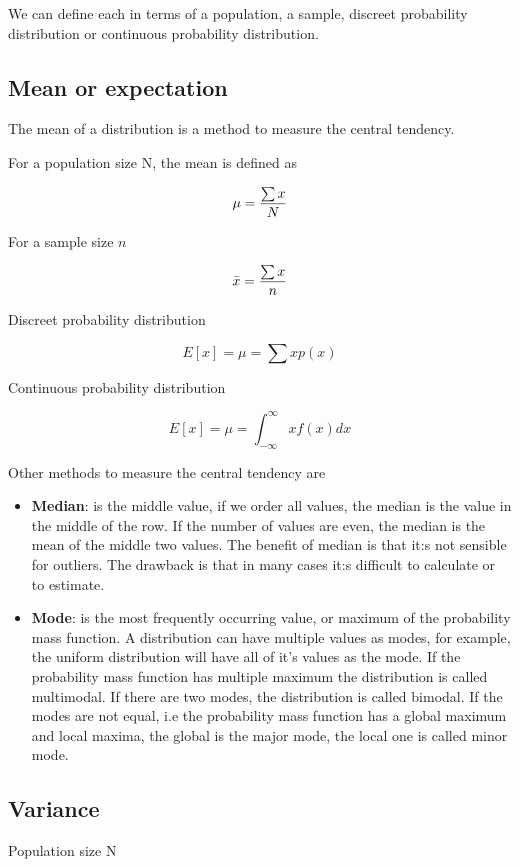 We can define each in terms of a population, a sample, discreet probability distribution or continuous probability distribution.

\subsection{Mean or expectation}

The mean of a distribution is a method to measure the central tendency.

For a population size N, the mean is defined as

\[\mu = {\sum x \over N}\]

For a sample size \(n\)

\[\bar x = {\sum x \over n}\]

Discreet probability distribution

\[E[x] = \mu = \sum x p(x)\]

Continuous probability distribution

\[E[x] = \mu = \int_{-\infty}^\infty x f(x) dx\]

Other methods to measure the central tendency are

\begin{itemize}
    \item \textbf{Median}: is the middle value, if we order all values, the median is the value in the middle of the row. If the number of values are even, the median is the mean of the middle two values. The benefit of median is that it:s not sensible for outliers. The drawback is that in many cases it:s difficult to calculate or to estimate.
    \item \textbf{Mode}: is the most frequently occurring value, or maximum of the probability mass function. A distribution can have multiple values as modes, for example, the uniform distribution will have all of it's values as the mode. If the probability mass function has multiple maximum the distribution is called multimodal. If there are two modes, the distribution is called bimodal. If the modes are not equal, i.e the probability mass function has a global maximum and local maxima, the global is the major mode, the local one is called minor mode.
\end{itemize}

\subsection{Variance}

Population size N

